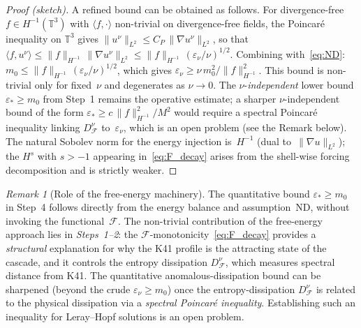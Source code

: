 \documentclass[12pt,a4paper]{article}
\theoremstyle{definition}
\theoremstyle{plain}
\theoremstyle{remark}
\newtheorem{remark}[definition]{Remark}
\begin{document}
\begin{proof}[Proof (sketch)]
A refined bound can be obtained as follows.  For divergence-free
$f \in H^{-1}(\mathbb{T}^3)$ with $\langle f, \cdot\rangle$ non-trivial
on divergence-free fields, the Poincar\'e inequality on $\mathbb{T}^3$
gives $\|u^\nu\|_{L^2} \le C_P\,\|\nabla u^\nu\|_{L^2}$, so that
$\langle f, u^\nu \rangle
\le \|f\|_{H^{-1}}\,\|\nabla u^\nu\|_{L^2}
\le \|f\|_{H^{-1}}\,(\varepsilon_\nu/\nu)^{1/2}$.
Combining with~\eqref{eq:ND}:
$m_0 \le \|f\|_{H^{-1}}\,(\varepsilon_\nu/\nu)^{1/2}$, which gives
$\varepsilon_\nu \ge \nu\,m_0^2/\|f\|_{H^{-1}}^2$.  This bound is
non-trivial only for fixed~$\nu$ and degenerates as $\nu \to 0$.
The $\nu$-\emph{independent} lower bound
$\varepsilon_* \ge m_0$ from Step~1 remains the operative estimate;
a sharper $\nu$-independent bound of the form
$\varepsilon_* \ge c\,\|f\|_{H^{-1}}^2 / M^2$
would require a spectral Poincar\'e inequality
linking $D_\mathcal{F}^\nu$ to~$\varepsilon_\nu$, which is an open
problem (see the Remark below).
The natural Sobolev norm for the energy injection is~$H^{-1}$ (dual
to~$\|\nabla u\|_{L^2}$); the $H^s$ with $s > -1$ appearing
in~\eqref{eq:F_decay} arises from the shell-wise forcing decomposition
and is strictly weaker.

\end{proof}

\begin{remark}[Role of the free-energy machinery]
The quantitative bound $\varepsilon_* \ge m_0$ in Step~4 follows
directly from the energy balance and assumption~ND, without invoking
the functional~$\mathcal{F}$.  The non-trivial contribution of the
free-energy approach lies in \emph{Steps~1--2}: the
$\mathcal{F}$-monotonicity~\eqref{eq:F_decay} provides a
\emph{structural} explanation for why the K41 profile is the attracting
state of the cascade, and it controls the entropy dissipation
$D_\mathcal{F}^\nu$, which measures spectral distance from K41.
The quantitative anomalous-dissipation bound can be sharpened (beyond
the crude $\varepsilon_\nu \ge m_0$) once the entropy-dissipation
$D_\mathcal{F}^\nu$ is related to the physical dissipation via a
\emph{spectral Poincar\'e inequality}.  Establishing such an inequality
for Leray--Hopf solutions is an open problem.
\end{remark}
\end{document}
